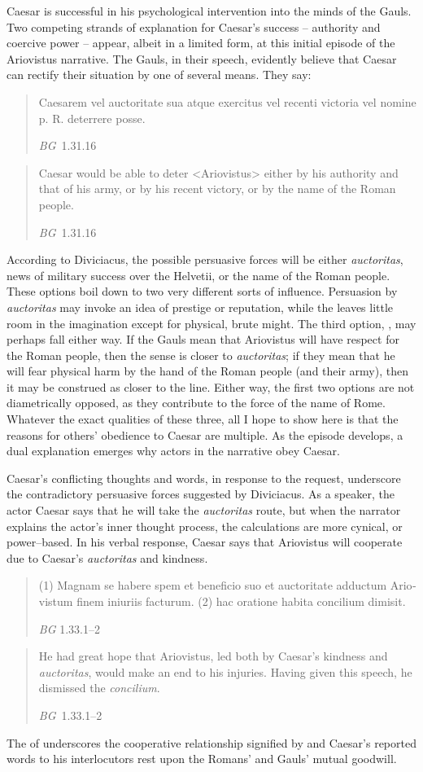 \documentclass[12pt,letterpaper,oneside,final]{memoir}
\begin{document}
Caesar is successful in his psychological intervention into the minds of the Gauls. Two competing strands of explanation for Caesar's success -- authority and coercive power -- appear, albeit in a limited form, at this initial episode of the Ariovistus narrative. The Gauls, in their speech, evidently believe that Caesar can rectify their situation by one of several means. They say: \blockquote[\emph{BG}~1.31.16]{\textlatin{Caesarem vel auctoritate sua atque exercitus vel recenti victoria vel nomine p. R. deterrere posse.}} \blockquote[\emph{BG}~1.31.16]{Caesar would be able to deter <Ariovistus> either by his authority and that of his army, or by his recent victory, or by the name of the Roman people.} According to Diviciacus, the possible persuasive forces will be either \emph{auctoritas}, news of military success over the Helvetii, or the name of the Roman people. These options boil down to two very different sorts of influence. Persuasion by \emph{auctoritas} may invoke an idea of prestige or reputation, while the  leaves little room in the imagination except for physical, brute might. The third option, , may perhaps fall either way. If the Gauls mean that Ariovistus will have respect for the Roman people, then the sense is closer to \emph{auctoritas}; if they mean that he will fear physical harm by the hand of the Roman people (and their army), then it may be construed as closer to the  line.  Either way, the first two options are not diametrically opposed, as they contribute to the force of the name of Rome. Whatever the exact qualities of these three, all I hope to show here is that the reasons for others' obedience to Caesar are multiple. As the episode develops, a dual explanation emerges why actors in the narrative obey Caesar.

Caesar's conflicting thoughts and words, in response to the request, underscore the contradictory persuasive forces suggested by Diviciacus. As a speaker, the actor Caesar says that he will take the \emph{auctoritas} route, but when the narrator explains the actor's inner thought process, the calculations are more cynical, or power--based. In his verbal response, Caesar says that Ariovistus will cooperate due to Caesar's \emph{auctoritas} and kindness. %
 \blockquote[\emph{BG} 1.33.1--2]{\textlatin{(1) Magnam se habere spem et beneficio suo et auctoritate adductum Ariovistum finem iniuriis facturum. (2) hac oratione habita concilium dimisit.}} 
 \blockquote[\emph{BG}~1.33.1--2]{He had great hope that Ariovistus, led both by Caesar's kindness and \emph{auctoritas}, would make an end to his injuries. Having given this speech, he dismissed the \emph{concilium}.}  The  of  underscores the cooperative relationship signified by  and  Caesar's reported words to his interlocutors rest upon the Romans' and Gauls' mutual goodwill.
\end{document}
